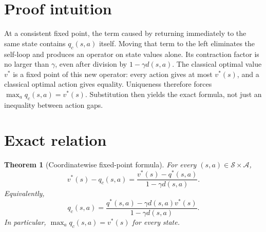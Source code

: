 \documentclass[11pt]{article}
\newtheorem{theorem}{Theorem}
\newcommand{\A}{\mathcal A}
\newcommand{\Sset}{\mathcal S}
\begin{document}
\section{Proof intuition}

At a consistent fixed point, the term caused by returning immediately to the
same state contains $q_c(s,a)$ itself.  Moving that term to the left eliminates
the self-loop and produces an operator on state values alone.  Its contraction
factor is no larger than $\gamma$, even after division by
$1-\gamma d(s,a)$.  The classical optimal value $v^*$ is a fixed point of
this new operator: every action gives at most $v^*(s)$, and a classical
optimal action gives equality.  Uniqueness therefore forces
$\max_a q_c(s,a)=v^*(s)$.  Substitution then yields the exact formula, not
just an inequality between action gaps.

\section{Exact relation}

\begin{theorem}[Coordinatewise fixed-point formula]
For every $(s,a)\in\Sset\times\A$,
\begin{equation}\label{eq:main}
 \boxed{
 v^*(s)-q_c(s,a)
   =\frac{v^*(s)-q^*(s,a)}{1-\gamma d(s,a)}.}
\end{equation}
Equivalently,
\begin{equation}\label{eq:qformula}
 q_c(s,a)
 =\frac{q^*(s,a)-\gamma d(s,a)v^*(s)}
        {1-\gamma d(s,a)}.
\end{equation}
In particular, $\max_a q_c(s,a)=v^*(s)$ for every state.
\end{theorem}
\end{document}
